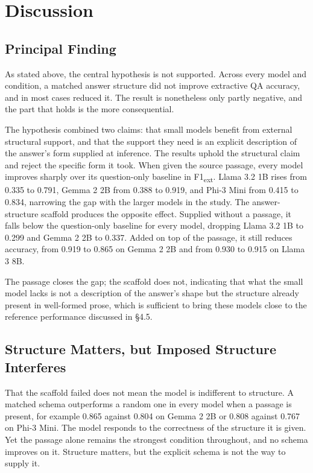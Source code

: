 \documentclass{article}
\begin{document}
\section{Discussion}

\subsection{Principal Finding}

As stated above, the central hypothesis is not supported. Across every model and condition, a matched answer structure did not improve extractive QA accuracy, and in most cases reduced it. The result is nonetheless only partly negative, and the part that holds is the more consequential.

The hypothesis combined two claims: that small models benefit from external structural support, and that the support they need is an explicit description of the answer's form supplied at inference. The results uphold the structural claim and reject the specific form it took. When given the source passage, every model improves sharply over its question-only baseline in F1\textsubscript{ext}. Llama 3.2 1B rises from 0.335 to 0.791, Gemma 2 2B from 0.388 to 0.919, and Phi-3 Mini from 0.415 to 0.834, narrowing the gap with the larger models in the study. The answer-structure scaffold produces the opposite effect. Supplied without a passage, it falls below the question-only baseline for every model, dropping Llama 3.2 1B to 0.299 and Gemma 2 2B to 0.337. Added on top of the passage, it still reduces accuracy, from 0.919 to 0.865 on Gemma 2 2B and from 0.930 to 0.915 on Llama 3 8B.

The passage closes the gap; the scaffold does not, indicating that what the small model lacks is not a description of the answer's shape but the structure already present in well-formed prose, which is sufficient to bring these models close to the reference performance discussed in \S4.5.

\subsection{Structure Matters, but Imposed Structure Interferes}

That the scaffold failed does not mean the model is indifferent to structure. A matched schema outperforms a random one in every model when a passage is present, for example 0.865 against 0.804 on Gemma 2 2B or 0.808 against 0.767 on Phi-3 Mini. The model responds to the correctness of the structure it is given. Yet the passage alone remains the strongest condition throughout, and no schema improves on it. Structure matters, but the explicit schema is not the way to supply it.
\end{document}
